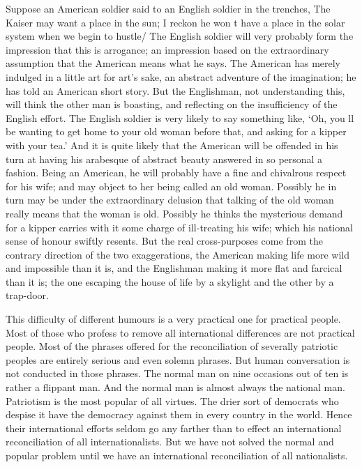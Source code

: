 \documentclass{book}
\begin{document}
Suppose an American soldier said to an English soldier in the trenches, The Kaiser may want a place in the sun; I reckon he won t have a place in the solar system when we begin to hustle/ The English soldier will very probably form the impression that this is arrogance; an impression based on the extraordinary assumption that the American means what he says. The American has merely indulged in a little art for art’s sake, an abstract adventure of the imagination; he has told an American short story. But the Englishman, not understanding this, will think the other man is boasting, and reflecting on the insufficiency of the English effort. The English soldier is very likely to say something like, ‘Oh, you ll be wanting to get home to your old woman before that, and asking for a kipper with your tea.’ And it is quite likely that the American will be offended in his turn at having his arabesque of abstract beauty answered in so personal a fashion. Being an American, he will probably have a fine and chivalrous respect for his wife; and may object to her being called an old woman. Possibly he in turn may be under the extraordinary delusion that talking of the old woman really means that the woman is old. Possibly he thinks the mysterious demand for a kipper carries with it some charge of ill-treating his wife; which his national sense of honour swiftly resents. But the real cross-purposes come from the contrary direction of the two exaggerations, the American making life more wild and impossible than it is, and the Englishman making it more flat and farcical than it is; the one escaping the house of life by a skylight and the other by a trap-door.

This difficulty of different humours is a very practical one for practical people. Most of those who profess to remove all international differences are not practical people. Most of the phrases offered for the reconciliation of severally patriotic peoples are entirely serious and even solemn phrases. But human conversation is not conducted in those phrases. The normal man on nine occasions out of ten is rather a flippant man. And the normal man is almost always the national man. Patriotism is the most popular of all virtues. The drier sort of democrats who despise it have the democracy against them in every country in the world. Hence their international efforts seldom go any farther than to effect an international reconciliation of all internationalists. But we have not solved the normal and popular problem until we have an international reconciliation of all nationalists.
\end{document}
